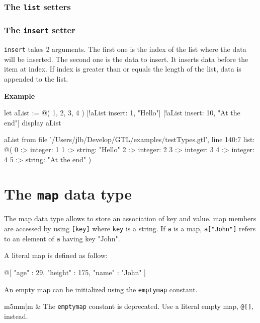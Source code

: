 \documentclass[10pt,openright,twosides,final]{memoir}
\newcommand{\gtltype}[1]{{\small\ttfamily #1}}
\newcommand{\scst}[1]{{\footnotesize\ttfamily\colorbox{light-blue}{"#1"}}}
\newcommand{\gtlarg}[1]{{\footnotesize\ttfamily\colorbox{light-blue}{#1}}}
\newcommand{\gtlinline}[1]{\colorbox{light-blue}{\lstinline[language=gtl]{#1}}}
\newcommand{\example}{\vspace{.75em}\noindent\textbf{Example}\vspace{0em}}
\newcommand\Warning{%
 \makebox[1.4em][c]{%
 \makebox[0pt][c]{\raisebox{-.05em}{\scriptsize!}}%
 \makebox[0pt][c]{\raisebox{-.2em}{\color{red}\Large$\bigtriangleup$}}}}%
\newcommand{\warning}[1]{%
\vspace{1em}
\hspace{-18.3mm}
\rowcolors{1}{white}{light-gray}
\begin{tabular}[b]{m{5mm}|m{\linewidth}}
\Warning & #1\\
\end{tabular}
}
\begin{document}
\subsubsection{The \texttt{list} setters}

\subsubsection{The \texttt{insert} setter}

\gtlinline{insert} takes 2 arguments. The first one is the \gtlarg{index} of the list where the data will be inserted. The second one is the \gtlarg{data} to insert. It inserts \gtlarg{data} before the item at \gtlarg{index}. If \gtlarg{index} is greater than or equals the length of the list, \gtlarg{data} is appended to the list.

\example
\begin{gtl}
let aList := @( 1, 2, 3, 4 )
[!aList insert: 1, "Hello"]
[!aList insert: 10, "At the end"]
display aList
\end{gtl}
\begin{console}
aList from file '/Users/jlb/Develop/GTL/examples/testTypes.gtl', line 140:7
    list: @(
        0 :>
            integer: 1
        1 :>
            string: "Hello"
        2 :>
            integer: 2
        3 :>
            integer: 3
        4 :>
            integer: 4
        5 :>
            string: "At the end"
    )
\end{console}

\section{The \texttt{map} data type}

The \gtltype{map} data type allows to store an association of key and value. \gtltype{map} members are accessed by using \gtlinline{[key]} where \gtlinline{key} is a \gtltype{string}. If \gtlinline{a} is a \gtltype{map}, \gtlinline{a["John"]} refers to an element of \gtlinline{a} having key \scst{John}.

A literal \gtltype{map} is defined as follow:

\begin{gtl}
@[ "age" : 29, "height" : 175, "name" : "John" ]
\end{gtl}

An empty map can be initialized using the \gtlinline{emptymap} constant.

\warning{The \gtlinline{emptymap} constant is deprecated. Use a literal empty map, \gtlinline{@[]}, instead.}
\end{document}
